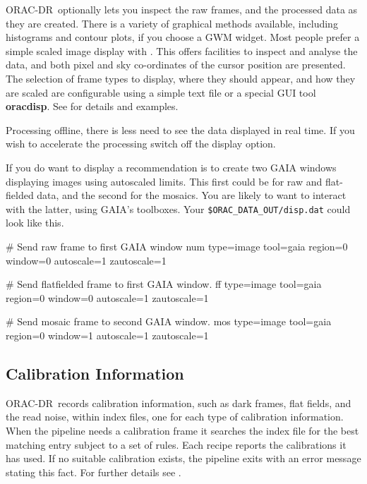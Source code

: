 \documentclass[twoside,11pt,nolof]{starlink}
\providecommand{\GAIA}{{\footnotesize GAIA}}
\providecommand{\KAPPA}{{\footnotesize KAPPA}}
\providecommand{\ORACDR}{{\footnotesize ORAC-DR}}
\begin{document}
\ORACDR\ optionally lets you inspect the raw frames, and the processed
data as they are created.  There is a variety of graphical
methods available, including histograms and contour plots, if you
choose a \xref{\KAPPA}{sun95}{} GWM widget.  Most people prefer a
simple scaled image display with \xref{\GAIA}{sun214}{}.  This offers
facilities to inspect and analyse the data, and both pixel and sky
co-ordinates of the cursor position are presented.  The selection of
frame types to display, where they should appear, and how they are
scaled are configurable using a simple text file or a special GUI tool
\textbf{oracdisp}.  See  for details
and examples.

Processing offline, there is less need to see the data displayed in real time.
If you wish to accelerate the processing switch off the display option.

\begin{terminalv}
\end{terminalv}

If you do want to display a recommendation is to create two GAIA windows
displaying images using autoscaled limits.  This first could be for
raw and flat-fielded data, and the second for the mosaics.  You are
likely to want to interact with the latter, using \GAIA's toolboxes.
Your \texttt{\$ORAC\_DATA\_OUT/disp.dat} could look like this.

\begin{terminalv}
      # Send raw frame to first GAIA window
      num type=image tool=gaia region=0 window=0 autoscale=1 zautoscale=1

      # Send flatfielded frame to first GAIA window.
      ff  type=image tool=gaia region=0 window=0 autoscale=1 zautoscale=1

      # Send mosaic frame to second GAIA window.
      mos type=image tool=gaia region=0 window=1 autoscale=1 zautoscale=1
\end{terminalv}

\subsection{Calibration Information\label{calibration_information}}

\ORACDR\ records calibration information, such as dark frames, flat
fields, and the read noise, within index files, one for each type of
calibration information.  When the pipeline needs a calibration frame
it searches the index file for the best matching entry subject to a
set of rules. Each recipe reports the calibrations it has used.  If no
suitable calibration exists, the pipeline exits with an error message
stating this fact.  For further details see
.
\end{document}
